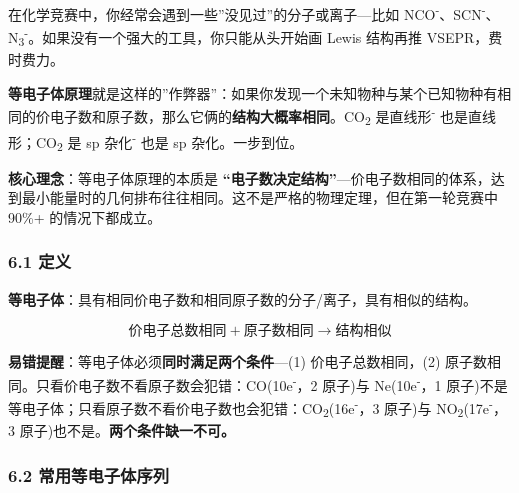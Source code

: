 在化学竞赛中，你经常会遇到一些''没见过''的分子或离子---比如 NCO\textsuperscript{-}、SCN\textsuperscript{-}、N\textsubscript{3}\textsuperscript{-}。如果没有一个强大的工具，你只能从头开始画 Lewis 结构再推 VSEPR，费时费力。

\textbf{等电子体原理}就是这样的''作弊器''：如果你发现一个未知物种与某个已知物种有相同的价电子数和原子数，那么它俩的\textbf{结构大概率相同}。CO\textsubscript{2} 是直线形\textsuperscript{-} 也是直线形；CO\textsubscript{2} 是 sp 杂化\textsuperscript{-} 也是 sp 杂化。一步到位。

\textbf{核心理念}：等电子体原理的本质是 \textbf{``电子数决定结构''}---价电子数相同的体系，达到最小能量时的几何排布往往相同。这不是严格的物理定理，但在第一轮竞赛中 90\%+ 的情况下都成立。

\subsubsection{6.1 定义}\label{ux5b9aux4e49}

\textbf{等电子体}：具有相同价电子数和相同原子数的分子/离子，具有相似的结构。

\[
\text{价电子总数相同} + \text{原子数相同} \rightarrow \text{结构相似}
\]

\textbf{易错提醒}：等电子体必须\textbf{同时满足两个条件}---(1) 价电子总数相同，(2) 原子数相同。只看价电子数不看原子数会犯错：CO(10e\textsuperscript{-}，2 原子)与 Ne(10e\textsuperscript{-}，1 原子)不是等电子体；只看原子数不看价电子数也会犯错：CO\textsubscript{2}(16e\textsuperscript{-}，3 原子)与 NO\textsubscript{2}(17e\textsuperscript{-}，3 原子)也不是。\textbf{两个条件缺一不可。}

\subsubsection{6.2 常用等电子体序列}\label{ux5e38ux7528ux7b49ux7535ux5b50ux4f53ux5e8fux5217}

